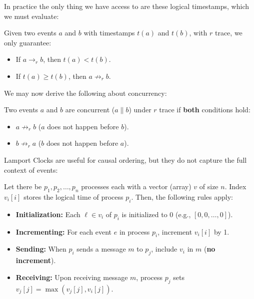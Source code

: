 \noindent
In practice the only thing we have access to are these logical timestamps, which we must evaluate:
\begin{theo}

    Given two events $a$ and $b$ with timestamps $t(a)$ and $t(b)$, with $r$ trace, we only guarantee:
    \begin{itemize}
        \item If $a \rightarrow_r b$, then $t(a) < t(b)$.
        \item If $t(a) \geq t(b)$, then $a \not\rightarrow_r b$.
    \end{itemize}
\end{theo}

\newpage 

\noindent
We may now derive the following about concurrency:
\begin{theo}

    Two events $a$ and $b$ are concurrent ($a \parallel b$) under $r$ trace if \textbf{both} conditions 
    hold:
    \begin{itemize}
        \item $a \not\rightarrow_r b$ ($a$ does not happen before $b$).
        \item $b \not\rightarrow_r a$ ($b$ does not happen before $a$).
    \end{itemize}
\end{theo}

\noindent
Lamport Clocks are useful for causal ordering, but they do not capture the full context of events:
\begin{Def}

   Let there be $p_1, p_2, \ldots, p_n$ processes each with a vector (array) $v$ of size $n$. Index $v_i[i]$ stores the logical time of process $p_i$.
   Then, the following rules apply:
   \begin{itemize}
    \item \textbf{Initialization:} Each $\ell\in v_i$ of $p_i$ is initialized to 0 (e.g., $[0,0,\dots,0]$).
    \item \textbf{Incrementing:} For each event $e$ in process $p_i$, increment $v_i[i]$ by 1.
    \item \textbf{Sending:} When $p_i$ sends a message $m$ to $p_j$, include $v_i$ in $m$ (\textbf{no increment}).
    \item \textbf{Receiving:} Upon receiving message $m$, process $p_j$ sets $v_j[j] = \max(v_j[j], v_i[j])$.
   \end{itemize}
\end{Def}

